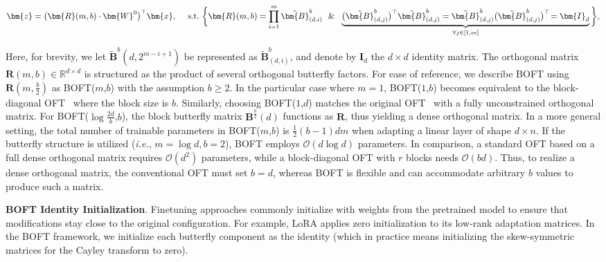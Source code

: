 \begin{equation}
    \begin{aligned}\nonumber
    \bm{z}=\big(\bm{R}(m,b)\cdot\bm{W}^0\big)^\top\bm{x},~~~~\text{s.t.}~\bigg{\{}\bm{R}(m,b)=\prod_{i=1}^m \tilde{\bm{B}}^b_{(d,i)}~~\&~~\underbrace{\big(\tilde{\bm{B}}^b_{(d,j)}\big)^\top\tilde{\bm{B}}^b_{(d,j)}=\tilde{\bm{B}}^b_{(d,j)}\big(\tilde{\bm{B}}^b_{(d,j)}\big)^\top\!=\bm{I}_d}_{\forall j\in [1, m]}\bigg{\}},
    \end{aligned}
\end{equation}

Here, for brevity, we let $\tilde{\bm{B}}^b(d,2^{m - i+1})$ be represented as $\tilde{\bm{B}}^b_{(d,i)}$, and denote by $\bm{I}_d$ the $d \times d$ identity matrix. The orthogonal matrix $\bm{R}(m,b)\in\mathbb{R}^{d\times d}$ is structured as the product of several orthogonal butterfly factors. For ease of reference, we describe BOFT using $\bm{R}(m,\frac{b}{2})$ as BOFT($m$,$b$) with the assumption $b\geq 2$. In the particular case where $m=1$, BOFT($1$,$b$) becomes equivalent to the block-diagonal OFT~\cite{qiu2023controlling} where the block size is $b$. Similarly, choosing BOFT($1$,$d$) matches the original OFT~\cite{qiu2023controlling} with a fully unconstrained orthogonal matrix. For BOFT($\log \frac{2d}{b}$,$b$), the block butterfly matrix $\bm{B}^{\frac{b}{2}}(d)$ functions as $\bm{R}$, thus yielding a dense orthogonal matrix. In a more general setting, the total number of trainable parameters in BOFT($m$,$b$) is $\frac{1}{2}(b-1)dm$ when adapting a linear layer of shape $d\times n$. If the butterfly structure is utilized (\emph{i.e.}, $m=\log d,b=2$), BOFT employs $\mathcal{O}(d\log d)$ parameters. In comparison, a standard OFT based on a full dense orthogonal matrix requires $\mathcal{O}(d^2)$ parameters, while a block-diagonal OFT with $r$ blocks needs $\mathcal{O}(bd)$. Thus, to realize a dense orthogonal matrix, the conventional OFT must set $b=d$, whereas BOFT is flexible and can accommodate arbitrary $b$ values to produce such a matrix.

\textbf{BOFT Identity Initialization}. Finetuning approaches commonly initialize with weights from the pretrained model to ensure that modifications stay close to the original configuration. For example, LoRA applies zero initialization to its low-rank adaptation matrices. In the BOFT framework, we initialize each butterfly component as the identity (which in practice means initializing the skew-symmetric matrices for the Cayley transform to zero).

